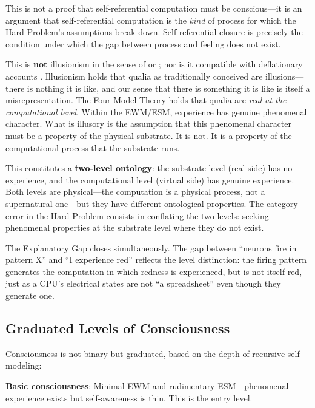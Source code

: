 \documentclass[12pt]{article}
\begin{document}
This is not a proof that self-referential computation must be conscious---\hspace{0pt}it is an argument that self-referential computation is the \emph{kind} of process for which the Hard Problem's assumptions break down. Self-referential closure is precisely the condition under which the gap between process and feeling does not exist.

This is \textbf{not} illusionism in the sense of \citet{Dennett1991} or \citet{Frankish2016}; nor is it compatible with deflationary accounts \citep{Graziano2024}. Illusionism holds that qualia as traditionally conceived are illusions---\hspace{0pt}there is nothing it is like, and our sense that there is something it is like is itself a misrepresentation. The Four-Model Theory holds that qualia are \emph{real at the computational level}. Within the EWM/ESM, experience has genuine phenomenal character. What is illusory is the assumption that this phenomenal character must be a property of the physical substrate. It is not. It is a property of the computational process that the substrate runs.

This constitutes a \textbf{two-level ontology}: the substrate level (real side) has no experience, and the computational level (virtual side) has genuine experience. Both levels are physical---\hspace{0pt}the computation is a physical process, not a supernatural one---\hspace{0pt}but they have different ontological properties. The category error in the Hard Problem consists in conflating the two levels: seeking phenomenal properties at the substrate level where they do not exist.

The Explanatory Gap closes simultaneously. The gap between ``neurons fire in pattern X'' and ``I experience red'' reflects the level distinction: the firing pattern generates the computation in which redness is experienced, but is not itself red, just as a CPU's electrical states are not ``a spreadsheet'' even though they generate one.


\subsection{Graduated Levels of Consciousness}

Consciousness is not binary but graduated, based on the depth of recursive self-modeling:

\textbf{Basic consciousness}: Minimal EWM and rudimentary ESM---\hspace{0pt}phenomenal experience exists but self-awareness is thin. This is the entry level.
\end{document}
